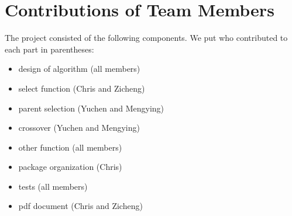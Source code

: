 \documentclass{article}\usepackage[]{graphicx}\usepackage[]{color}
\begin{document}
\section*{Contributions of Team Members}

The project consisted of the following components. We put who contributed to each part in parentheses:
\begin{itemize}
\item design of algorithm (all members)
\item select function (Chris and Zicheng)
\item parent selection (Yuchen and Mengying)
\item crossover (Yuchen and Mengying)
\item other function (all members)
\item package organization (Chris)
\item tests (all members)
\item pdf document (Chris and Zicheng)
\end{itemize}
\end{document}
